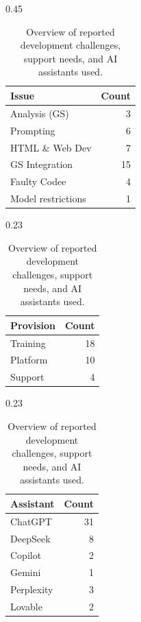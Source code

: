 \documentclass[english,anonymous]{lni}
\begin{document}
\begin{table}[ht]
\centering
\begin{subtable}[t]{0.45\textwidth}
\centering
\caption{Reported Difficulties}
\begin{tabular}{@{}lr@{}}
\toprule
\textbf{Issue} & \textbf{Count} \\
\midrule
Analysis (GS)                        & 3  \\
Prompting                         & 6  \\
HTML \& Web Dev           & 7  \\
GS Integration                         & 15 \\
	Faulty Codee       & 4  \\
Model restrictions            & 1  \\
\bottomrule
\end{tabular}
\end{subtable}
\hfill
\begin{subtable}[t]{0.23\textwidth}
\centering
\caption{Needs}
\begin{tabular}{@{}lr@{}}
\toprule
\textbf{Provision} & \textbf{Count} \\
\midrule
Training              & 18 \\
Platform  & 10 \\
Support     & 4  \\
\bottomrule
\end{tabular}
\end{subtable}
\hfill
\begin{subtable}[t]{0.23\textwidth}
\centering
\caption{AI assistants}
\begin{tabular}{@{}lr@{}}
\toprule
\textbf{Assistant} & \textbf{Count} \\
\midrule
ChatGPT     & 31 \\
DeepSeek    & 8  \\
Copilot     & 2  \\
Gemini      & 1  \\
Perplexity  & 3  \\
Lovable     & 2  \\
\bottomrule
\end{tabular}
\end{subtable}

\caption{Overview of reported development challenges, support needs, and AI assistants used.}
\label{tab:free-texts}
\end{table}
\end{document}
